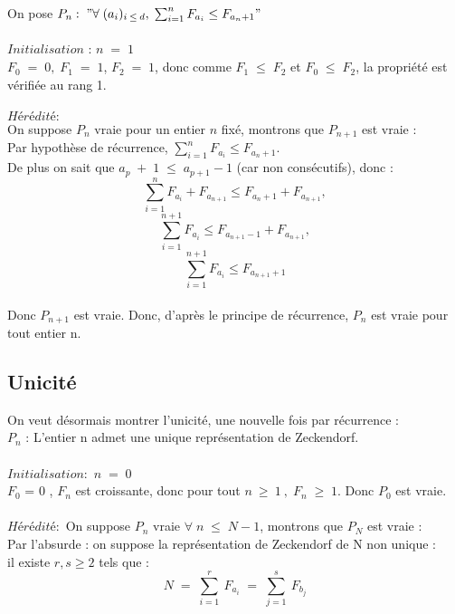 \documentclass{article}
\begin{document}
On pose $ P_n : \; "\forall \; (a_i)_{i \: \leq \: d}, \;  \sum_{i=1}^{n} F_{a_i} \leq F_{a_{n}+1}"
$\\\\
$Initialisation$ : $n\;=\;1$\\ 

$F_0 \; = \; 0, \;F_1 \; = \; 1$, $F_2 \;=  \; 1$, donc comme $F_1 \; \leq \; F_2$ et $F_0 \; \leq \; F_2$, la propriété est vérifiée au rang 1.
\\\\
$Hérédité :$ \\

On suppose $P_n$ vraie pour un entier $n$ fixé, montrons que $P_{n+1}$ est vraie :\\
Par hypothèse de récurrence, $\sum_{i=1}^{n} F_{a_i} \leq F_{a_{n}+1}$.\\
De plus on sait que $a_p \; + \; 1 \; \leq \; a_{p+1}-1$ (car non consécutifs), donc : \[ \sum_{i=1}^{n} F_{a_i} + F_{a_{n+1}} \leq F_{a_n + 1} + F_{a_{n+1}},\]
\[ \sum_{i=1}^{n+1} F_{a_i} \leq F_{a_{n+1} - 1} + F_{a_{n+1}},\]
\[ \sum_{i=1}^{n+1} F_{a_i} \leq F_{a_{n+1} + 1} \]\\

Donc $P_{n+1}$ est vraie. Donc, d'après le principe de récurrence, $P_n$ est vraie pour tout entier n.


\subsection{Unicité}

On veut désormais montrer l'unicité, une nouvelle fois par récurrence :\\

$P_n$ : L'entier n admet une unique représentation de Zeckendorf.\\\\
$Initialisation :$ $n\;=\;0$\\

$F_0$ = 0 , $F_n$ est croissante, donc pour tout $n \: \geq \: 1 \:, \; F_n \; \geq \; 1$. Donc $P_0$ est vraie.
\\\\
$Hérédité :$ On suppose $P_{n}$ vraie $\forall \; n \; \leq \; N-1$, montrons que $P_{N}$ est vraie :\\

Par l'absurde : on suppose la représentation de Zeckendorf de N non unique : \\
il existe $r,s \geq 2$ tels que :
\[N \; = \; \sum_{i=1}^r \: F_{a_i} \; = \; \sum_{j=1}^s \: F_{b_j} \]
\end{document}
